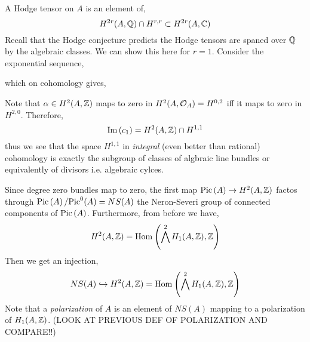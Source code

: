 \documentclass[12pt]{article}
\begin{document}
\begin{prop}
A Hodge tensor on $A$ is an element of,
\[ H^{2r}(A, \mathbb{Q}) \cap H^{r, r} \subset H^{2r}(A, \mathbb{C}) \]
Recall that the Hodge conjecture predicts the Hodge tensors are spaned over $\mathbb{Q}$ by the algebraic classes. We can show this here for $r = 1$. Consider the exponential sequence,
\begin{center}
\end{center}
which on cohomology gives,
\begin{center}
\end{center}
Note that $\alpha \in H^2(A, \mathbb{Z})$ maps to zero in $H^2(A, \mathcal{O}_{A}) = H^{0,2}$ iff it maps to zero in $H^{2,0}$. Therefore,
\[ \mathrm{Im}\left( c_1 \right) = H^2(A, \mathbb{Z}) \cap H^{1,1} \]
thus we see that the space $H^{1,1}$ in \textit{integral} (even better than rational) cohomology is exactly the subgroup of classes of algbraic line bundles or equivalently of divisors i.e. algebraic cylces.
\end{prop}

\begin{rmk}
Since degree zero bundles map to zero, the first map $\mathrm{Pic} \left( A \right) \to H^2(A, \mathbb{Z})$ factos through $\mathrm{Pic} \left( A \right) / \mathrm{Pic}^0(A) = NS(A)$ the Neron-Severi group of connected components of $\mathrm{Pic} \left( A \right)$. Furthermore, from before we have,
\[ H^{2}(A, \mathbb{Z}) = \mathrm{Hom}_{} \left( \bigwedge^2 H_1(A, \mathbb{Z}), \mathbb{Z} \right) \]
Then we get an injection,
\[ NS(A) \hookrightarrow H^2(A, \mathbb{Z}) = \mathrm{Hom}_{} \left( \bigwedge^2 H_1(A, \mathbb{Z}), \mathbb{Z} \right) \]
Note that a \textit{polarization} of $A$ is an element of $NS(A)$ mapping to a polarization of $H_1(A, \mathbb{Z})$. (LOOK AT PREVIOUS DEF OF POLARIZATION AND COMPARE!!)
\end{rmk}
\end{document}
